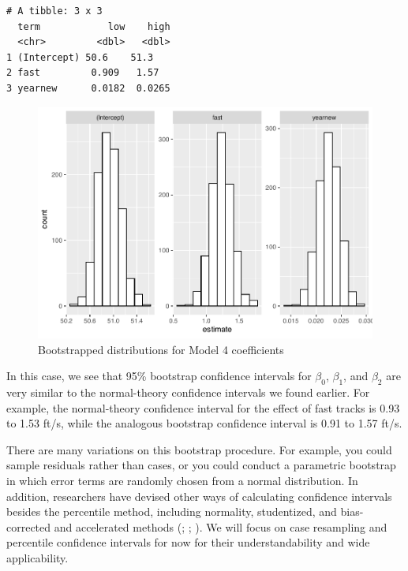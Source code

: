 \documentclass[
]{krantz}
\begin{document}
\begin{verbatim}
# A tibble: 3 x 3
  term            low    high
  <chr>         <dbl>   <dbl>
1 (Intercept) 50.6    51.3   
2 fast         0.909   1.57  
3 yearnew      0.0182  0.0265
\end{verbatim}

\begin{figure}

{\centering \includegraphics[width=0.9\linewidth]{bookdown-BeyondMLR_files/figure-latex/boot4-1} 

}

\caption{Bootstrapped distributions for Model 4 coefficients}\label{fig:boot4}
\end{figure}

In this case, we see that 95\% bootstrap confidence intervals for \(\beta_0\), \(\beta_1\), and \(\beta_2\) are very similar to the normal-theory confidence intervals we found earlier. For example, the normal-theory confidence interval for the effect of fast tracks is 0.93 to 1.53 ft/s, while the analogous bootstrap confidence interval is 0.91 to 1.57 ft/s.

There are many variations on this bootstrap procedure. For example, you could sample residuals rather than cases, or you could conduct a parametric bootstrap in which error terms are randomly chosen from a normal distribution. In addition, researchers have devised other ways of calculating confidence intervals besides the percentile method, including normality, studentized, and bias-corrected and accelerated methods (\citet{Hesterberg2015}; \citet{Efron1993}; \citet{Davison1997}). We will focus on case resampling and percentile confidence intervals for now for their understandability and wide applicability.
\end{document}
